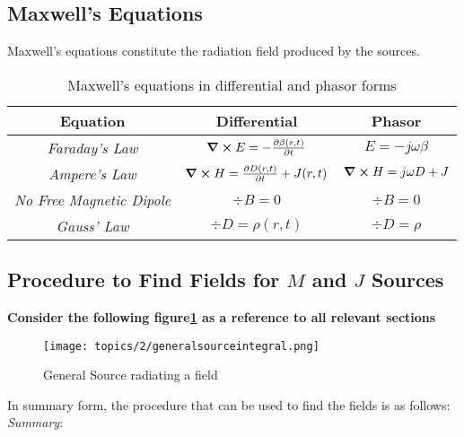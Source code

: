 \documentclass[class=article, crop=false]{standalone}
\begin{document}
    \subsection{Maxwell's Equations}
    Maxwell's equations constitute the radiation field produced by the sources.\\
    \begin{table}[h]
        \centering
        \begin{tabular}{||c|c|c||}
            \hline
            \textbf{Equation} & \textbf{Differential} & \textbf{Phasor} \\
            \hline\hline
            \emph{Faraday's Law} & $ \curl E = - \pdv{\beta(r, t)}{t} $  & $ E = -j  \omega \beta $  \\
            \emph{Ampere's Law} & $ \curl H = \pdv{D(r,t)}{t} + J(r,t) $ & $ \curl H = j \omega D + J $ \\
            \emph{No Free Magnetic Dipole} &  $ \div B = 0 $ & $ \div B = 0 $ \\
            \emph{Gauss' Law} & $\div D = \rho(r,t) $ & $\div D = \rho $ \\
            \hline
        \end{tabular}
        \caption{Maxwell's equations in differential and phasor forms}
        \label{table:maxwelleqs}
    \end{table}
    \subsection{Procedure to Find Fields for $M$ and $J$ Sources}
    \textbf{Consider the following figure\ref{fig:generalsourceintegral} as a reference to all relevant sections}
    \begin{figure}[h!]
        \texttt{[image: topics/2/generalsourceintegral.png]}
        \caption{General Source radiating a field \cite{BALANIS}}
        \label{fig:generalsourceintegral}
    \end{figure}

    In summary form, the procedure that can be used to find the fields is as follows: \\

    \emph{Summary}: \\
\end{document}
